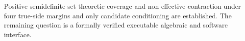 Positive-semidefinite set-theoretic coverage and non-effective contraction under four true-side margins and only candidate conditioning are established. The remaining question is a formally verified executable algebraic and software interface.